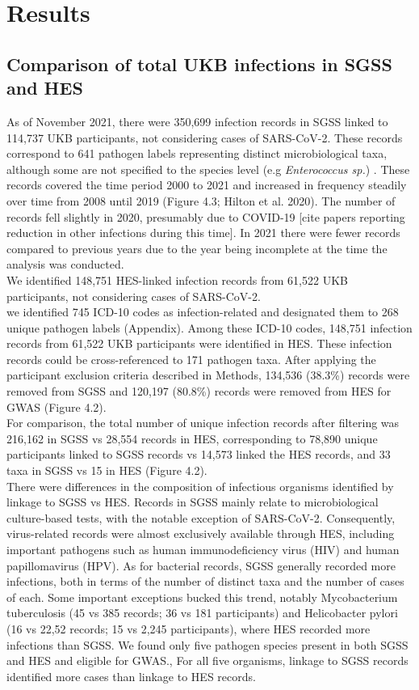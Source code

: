 \documentclass{article}
\begin{document}
\section{Results}
\subsection{Comparison of total UKB infections in SGSS and HES}
As of November 2021, there were 350,699 infection records in SGSS linked to 114,737 UKB participants, not considering cases of SARS-CoV-2. These records correspond to 641 pathogen labels representing distinct microbiological taxa, although some are not specified to the species level (e.g \textit{Enterococcus sp.}) . These records covered the time period 2000 to 2021 and increased in frequency steadily over time from 2008 until 2019 (Figure 4.3; Hilton et al. 2020). The number of records fell slightly in 2020, presumably due to COVID-19 [cite papers reporting reduction in other infections during this time]. In 2021 there were fewer records compared to previous years due to the year being incomplete at the time the analysis was conducted.
\\
We identified 148,751 HES-linked infection records from 61,522 UKB participants, not considering cases of SARS-CoV-2.
\\
we identified 745 ICD-10 codes as infection-related and designated them to 268 unique pathogen labels (Appendix). Among these ICD-10 codes, 148,751 infection records from 61,522 UKB participants were identified in HES. These infection records could be cross-referenced to 171 pathogen taxa. After applying the participant exclusion criteria described in Methods, 134,536 (38.3\%) records were removed from SGSS and 120,197 (80.8\%) records were removed from HES for GWAS (Figure 4.2).
\\
For comparison, the total number of unique infection records after filtering was 216,162 in SGSS vs 28,554 records in HES, corresponding to 78,890 unique participants linked to SGSS records vs 14,573 linked the HES records, and 33 taxa in SGSS vs 15 in HES (Figure 4.2).
\\
There were differences in the composition of infectious organisms identified by linkage to SGSS vs HES. Records in SGSS mainly relate to microbiological culture-based tests, with the notable exception of SARS-CoV-2. Consequently, virus-related records were almost exclusively available through HES,  including important pathogens such as human immunodeficiency virus (HIV) and human papillomavirus (HPV). As for bacterial records, SGSS generally recorded more infections, both in terms of the number of distinct taxa and the number of cases of each. Some important exceptions bucked this trend, notably Mycobacterium tuberculosis (45 vs 385 records; 36 vs 181 participants) and Helicobacter pylori (16 vs 22,52 records; 15 vs 2,245 participants), where HES recorded more infections than SGSS. We found only five pathogen species present in both SGSS and HES and eligible for GWAS., For all five organisms, linkage to SGSS records identified more cases than linkage to HES records.
\end{document}
